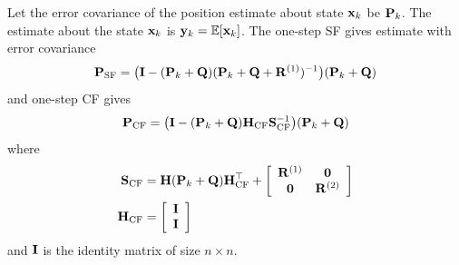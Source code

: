 Let the error covariance of the position estimate about state ${\bf x}_k$ be ${\bf P}_k$. The estimate about the state ${\bf x}_k$ is ${\bf y}_k=\mathbb{E}[{\bf x}_k]$. The one-step SF gives estimate with error covariance
\begin{equation}
{\bf P}_{\text{SF}}=\big({\bf I}-({\bf P}_k+{\bf Q})({\bf P}_k+{\bf Q}+{\bf R}^{(1)})^{-1}\big)({\bf P}_k+{\bf Q})%
\end{equation}
and one-step CF gives
\begin{equation}
{\bf P}_{\text{CF}}=\big({\bf I}-({\bf P}_k+{\bf Q}){\bf H}_\text{CF}{\bf S}_\text{CF}^{-1}\big)({\bf P}_k+{\bf Q})%
\end{equation}
where
\begin{equation}
\begin{split}
{\bf S}_\text{CF}&={\bf H}({\bf P}_k+{\bf Q}){\bf H}_\text{CF}^\top+\left[
                                                    \begin{array}{cc}
                                                      {\bf R}^{(1)} & {\bf 0} \\
                                                      {\bf 0} & {\bf R}^{(2)} \\
                                                    \end{array}
                                                  \right]
\\
{\bf H}_\text{CF}&=\left[
           \begin{array}{c}
             {\bf I} \\
             {\bf I} \\
           \end{array}
         \right] \\
\end{split}
\end{equation}
and ${\bf I}$ is the identity matrix of size $n\times n$.

